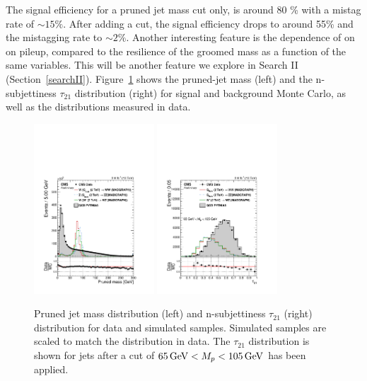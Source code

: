 The signal efficiency for a pruned jet mass cut only, is around 80 \% with a mistag rate of $\sim 15\%$. After adding a \nsubj cut, the signal efficiency drops to around 55\% and the mistagging rate to $\sim 2\%$. Another interesting feature is the dependence of \nsubj on \PT on pileup, compared to the resilience of the groomed mass as a function of the same variables. This will be another feature we explore in Search II (Section~\ref{searchII}). Figure~\ref{fig:wtag} shows the pruned-jet mass (left) and the n-subjettiness $\tau_{21}$ distribution (right) for signal and background Monte Carlo, as well as the distributions measured in data. 

\begin{figure}[h!]
\centering
\includegraphics[width=0.4\textwidth]{figures/analysis/search1/AN-15-211/controlplots/silverjson/PrunedMass_WSignal.pdf}
\includegraphics[width=0.4\textwidth]{figures/analysis/search1/AN-15-211/controlplots/silverjson/Tau21_punzi_WSignal.pdf}\\
\caption{Pruned jet mass distribution (left) and n-subjettiness $\tau_{21}$ (right) distribution for data and simulated samples. Simulated samples are scaled to match the distribution in data. The $\tau_{21}$ distribution is shown for jets after a cut of $65 {\,\text{Ge\hspace{-.08em}V}} < M_{p} < 105 {\,\text{Ge\hspace{-.08em}V}}$ has been applied.}
\label{fig:wtag}
\end{figure}


